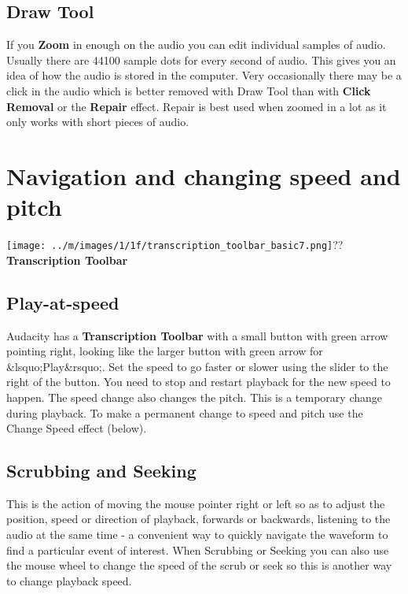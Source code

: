 \documentclass[twocolumn]{book}
\begin{document}
\subsection{Draw Tool}


If you \textbf{Zoom} in enough on the audio you can edit individual samples of audio. Usually there are 44100 sample dots for every second of audio.  This  gives you an idea of how the audio is stored in the computer.  Very occasionally there may be a click in the audio which is better removed with Draw Tool than with \textbf{Click Removal} or the \textbf{Repair} effect.  Repair is best used when zoomed in a lot as it only works with short pieces of audio.



\section{Navigation and changing speed and pitch}

\texttt{[image: ../m/images/1/1f/transcription\_toolbar\_basic7.png]}??\textbf{Transcription Toolbar}

\subsection{Play-at-speed}


Audacity has a \textbf{Transcription Toolbar} with a small button with green arrow pointing right, looking like the larger button with green arrow for \&lsquo;Play\&rsquo;.  Set the speed to go faster or slower using the slider to the right of the button.  You need to stop and restart playback for the new speed to happen. The speed change also changes the pitch.  This is a temporary change during playback.  To make a permanent change to speed and pitch use the Change Speed effect (below).

\subsection{Scrubbing and Seeking}


This is the action of moving the mouse pointer right or left so as to adjust the position, speed or direction of playback, forwards or backwards, listening to the audio at the same time - a convenient way to quickly navigate the waveform to find a particular event of interest. When Scrubbing or Seeking you can also use the mouse wheel to change the speed of the scrub or seek so this is another way to change playback speed.
\end{document}
